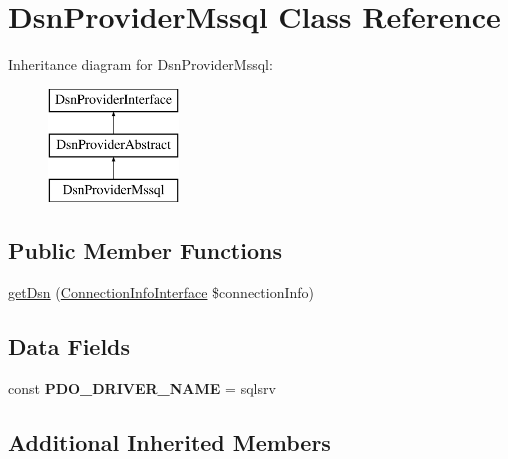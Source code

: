\hypertarget{class_pes_1_1_database_1_1_handler_1_1_dsn_provider_1_1_dsn_provider_mssql}{}\section{Dsn\+Provider\+Mssql Class Reference}
\label{class_pes_1_1_database_1_1_handler_1_1_dsn_provider_1_1_dsn_provider_mssql}
Inheritance diagram for Dsn\+Provider\+Mssql\+:\begin{figure}[H]
\begin{center}
\leavevmode
\includegraphics[height=3.000000cm]{class_pes_1_1_database_1_1_handler_1_1_dsn_provider_1_1_dsn_provider_mssql}
\end{center}
\end{figure}
\subsection*{Public Member Functions}
\begin{DoxyCompactItemize}
\item 
\mbox{\hyperlink{class_pes_1_1_database_1_1_handler_1_1_dsn_provider_1_1_dsn_provider_mssql_a7252e2f23ea50a5061fef81d06d6765a}{get\+Dsn}} (\mbox{\hyperlink{interface_pes_1_1_database_1_1_handler_1_1_connection_info_interface}{Connection\+Info\+Interface}} \$connection\+Info)
\end{DoxyCompactItemize}
\subsection*{Data Fields}
\begin{DoxyCompactItemize}
\item 
\mbox{\label{class_pes_1_1_database_1_1_handler_1_1_dsn_provider_1_1_dsn_provider_mssql_a0227fdc89c3004d9beb98a9894a3c0ec}} 
const {\bfseries P\+D\+O\+\_\+\+D\+R\+I\+V\+E\+R\+\_\+\+N\+A\+ME} = \textquotesingle{}sqlsrv\textquotesingle{}
\end{DoxyCompactItemize}
\subsection*{Additional Inherited Members}


